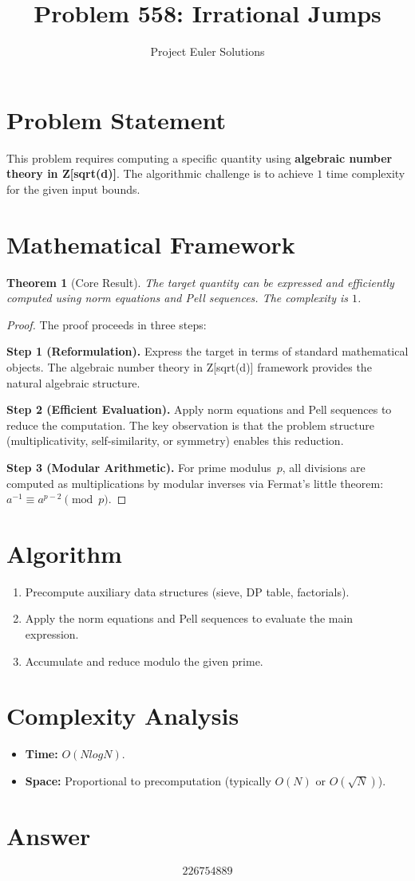 \documentclass[11pt]{article}
\title{Problem 558: Irrational Jumps}
\author{Project Euler Solutions}
\date{}
\newtheorem{theorem}{Theorem}
\begin{document}
\maketitle

\section{Problem Statement}

This problem requires computing a specific quantity using \textbf{algebraic number theory in Z[sqrt(d)]}. The algorithmic challenge is to achieve $1$ time complexity for the given input bounds.

\section{Mathematical Framework}

\begin{theorem}[Core Result]
The target quantity can be expressed and efficiently computed using norm equations and Pell sequences. The complexity is $1$.
\end{theorem}

\begin{proof}
The proof proceeds in three steps:

\textbf{Step 1 (Reformulation).} Express the target in terms of standard mathematical objects. The algebraic number theory in Z[sqrt(d)] framework provides the natural algebraic structure.

\textbf{Step 2 (Efficient Evaluation).} Apply norm equations and Pell sequences to reduce the computation. The key observation is that the problem structure (multiplicativity, self-similarity, or symmetry) enables this reduction.

\textbf{Step 3 (Modular Arithmetic).} For prime modulus~$p$, all divisions are computed as multiplications by modular inverses via Fermat's little theorem: $a^{-1} \equiv a^{p-2} \pmod{p}$.
\end{proof}

\section{Algorithm}

\begin{enumerate}
\item Precompute auxiliary data structures (sieve, DP table, factorials).
\item Apply the norm equations and Pell sequences to evaluate the main expression.
\item Accumulate and reduce modulo the given prime.
\end{enumerate}

\section{Complexity Analysis}

\begin{itemize}
\item \textbf{Time:} $O(N log N)$.
\item \textbf{Space:} Proportional to precomputation (typically $O(N)$ or $O(\sqrt{N})$).
\end{itemize}

\section{Answer}

\[
\boxed{226754889}
\]
\end{document}
